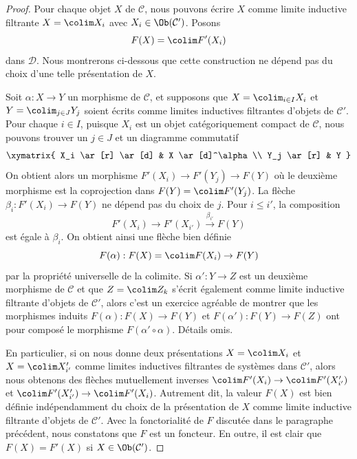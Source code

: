 \begin{proof}
Pour chaque objet $X$ de $\mathcal{C}$, nous pouvons écrire $X$ comme limite
inductive filtrante $X = \colim X_i$ avec $X_i \in \Ob(\mathcal{C}')$. Posons
$$
F(X) = \colim F'(X_i)
$$
dans $\mathcal{D}$. Nous montrerons ci-dessous que cette construction ne
dépend pas du choix d'une telle présentation de $X$.

\medskip\noindent
Soit $\alpha : X \to Y$ un morphisme de $\mathcal{C}$, et supposons que $X = \colim_{i \in I} X_i$ et $Y = \colim_{j \in J} Y_j$ soient écrits comme
limites inductives filtrantes d'objets de $\mathcal{C}'$. Pour chaque $i \in I$, puisque
$X_i$ est un objet catégoriquement compact de $\mathcal{C}$, nous pouvons
trouver un $j \in J$ et un diagramme commutatif
$$
\xymatrix{
X_i \ar[r] \ar[d] & X \ar[d]^\alpha \\
Y_j \ar[r] & Y
}
$$
On obtient alors un morphisme $F'(X_i) \to F'(Y_j) \to F(Y)$ où le deuxième
morphisme est la coprojection dans $F(Y) = \colim F'(Y_j)$. La flèche $\beta_i : F'(X_i) \to F(Y)$ ne dépend pas du choix de $j$. Pour $i \leq i'$, la
composition
$$
F'(X_i) \to F'(X_{i'}) \xrightarrow{\beta_{i'}} F(Y)
$$
est égale à $\beta_i$. On obtient ainsi une flèche bien définie
$$
F(\alpha) : F(X) = \colim F(X_i) \to F(Y)
$$
par la propriété universelle de la colimite. Si $\alpha' : Y \to Z$ est un
deuxième morphisme de $\mathcal{C}$ et que $Z = \colim Z_k$ s'écrit également
comme limite inductive filtrante d'objets de $\mathcal{C}'$, alors c'est un exercice
agréable de montrer que les morphismes induits $F(\alpha) : F(X) \to F(Y)$ et
$F(\alpha') : F(Y) \to F(Z)$ ont pour composé le morphisme $F(\alpha' \circ \alpha)$.
Détails omis.

\medskip\noindent
En particulier, si on nous donne deux présentations $X = \colim X_i$ et $X = \colim X'_{i'}$ comme limites inductives filtrantes de systèmes dans $\mathcal{C}'$,
alors nous obtenons des flèches mutuellement inverses $\colim F'(X_i) \to \colim F'(X'_{i'})$ et $\colim F'(X'_{i'}) \to \colim F'(X_i)$. Autrement dit,
la valeur $F(X)$ est bien définie indépendamment du choix de la présentation
de $X$ comme limite inductive filtrante d'objets de $\mathcal{C}'$. Avec la
fonctorialité de $F$ discutée dans le paragraphe précédent, nous constatons
que $F$ est un foncteur. En outre, il est clair que $F(X) = F'(X)$ si $X \in \Ob(\mathcal{C}')$.


\end{proof}

